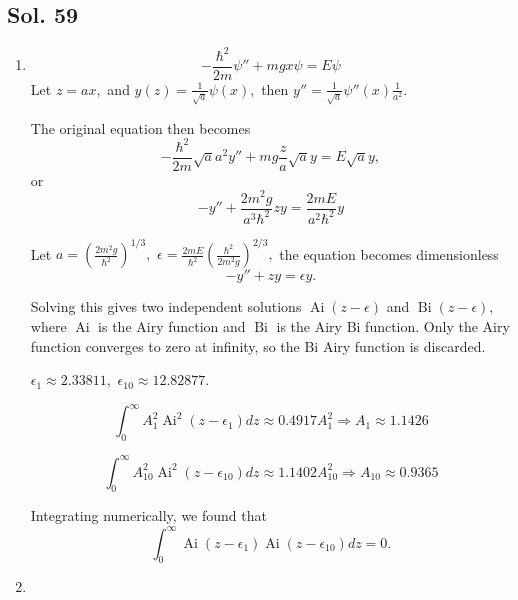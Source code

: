 \subsection*{Sol. 59}
\begin{enumerate}
    \item 
    $$
    -\frac{\hbar^2}{2m}\psi''
    + mgx\psi = E\psi
    $$
    Let $z=ax,$ and $y(z)=\frac{1}{\sqrt{a}}\psi(x),$
    then
    $y''=\frac{1}{\sqrt{a}}\psi''(x)\frac{1}{a^2}.$

    The original equation then becomes
    $$
    -\frac{\hbar^2}{2m}
    \sqrt{a}a^2y''
    +mg\frac{z}{a}\sqrt{a}y
    =E\sqrt{a}y,
    $$
    or 
    $$
    -y''
    +\frac{2m^2g}{a^3\hbar^2}zy
    =\frac{2mE}{a^2\hbar^2}y
    $$

    Let $a=\left(\frac{2m^2g}{\hbar^2}\right)^{1/3},$ 
    $\epsilon=
    \frac{2mE}{\hbar^2}
    \left(\frac{\hbar^2}{2m^2g}\right)^{2/3},
    $
     the equation becomes dimensionless 
     $$
     -y'' + zy = \epsilon y.
     $$

    Solving this gives two independent solutions $\operatorname{Ai}(z-\epsilon)$
    and 
    $\operatorname{Bi}(z-\epsilon),$
where $\operatorname{Ai}$ is the Airy function and $\operatorname{Bi}$ is the Airy Bi function.
Only the Airy function converges to zero at infinity, so the Bi Airy function is discarded.

    $\epsilon_1\approx2.33811,$ $\epsilon_{10}\approx12.82877.$


    $$
    \int_0^\infty A_1^2\operatorname{Ai}^2(z-\epsilon_1)dz
    \approx 0.4917A_1^2
    \Rightarrow A_1\approx1.1426
    $$

    $$
    \int_0^\infty A_{10}^2\operatorname{Ai}^2(z-\epsilon_{10})dz
    \approx 1.1402A_{10}^2
    \Rightarrow 
    A_{10}\approx0.9365
    $$
    

Integrating numerically, we found that 
$$
\int_{0}^{\infty}
\operatorname{Ai}(z-\epsilon_1)
\operatorname{Ai}(z-\epsilon_{10})dz = 0.
$$
    
    \item 
    

\end{enumerate}

